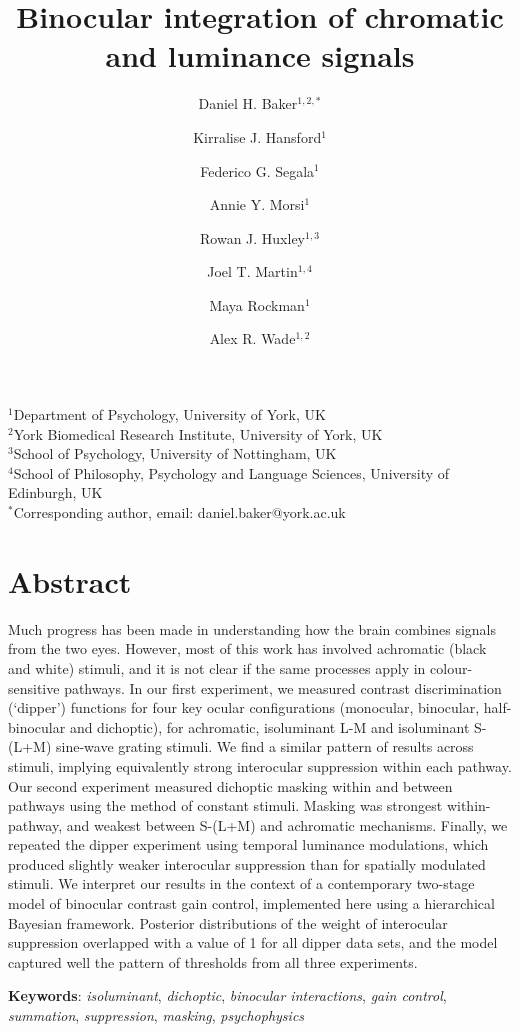 \documentclass[
  letterpaper,
  DIV=11,
  numbers=noendperiod]{scrartcl}
\title{Binocular integration of chromatic and luminance signals}
\author{Daniel H. Baker\(^{1,2,*}\) \and Kirralise J.
Hansford\(^1\) \and Federico G. Segala\(^1\) \and Annie Y.
Morsi\(^1\) \and Rowan J. Huxley\(^{1,3}\) \and Joel T.
Martin\(^{1,4}\) \and Maya Rockman\(^1\) \and Alex R. Wade\(^{1,2}\)}
\date{}
\begin{document}
\maketitle

\(^1\)Department of Psychology, University of York, UK\\
\(^2\)York Biomedical Research Institute, University of York, UK\\
\(^3\)School of Psychology, University of Nottingham, UK\\
\(^4\)School of Philosophy, Psychology and Language Sciences, University
of Edinburgh, UK\\
\(^*\)Corresponding author, email: daniel.baker@york.ac.uk

\section{Abstract}\label{abstract}

Much progress has been made in understanding how the brain combines
signals from the two eyes. However, most of this work has involved
achromatic (black and white) stimuli, and it is not clear if the same
processes apply in colour-sensitive pathways. In our first experiment,
we measured contrast discrimination (`dipper') functions for four key
ocular configurations (monocular, binocular, half-binocular and
dichoptic), for achromatic, isoluminant L-M and isoluminant S-(L+M)
sine-wave grating stimuli. We find a similar pattern of results across
stimuli, implying equivalently strong interocular suppression within
each pathway. Our second experiment measured dichoptic masking within
and between pathways using the method of constant stimuli. Masking was
strongest within-pathway, and weakest between S-(L+M) and achromatic
mechanisms. Finally, we repeated the dipper experiment using temporal
luminance modulations, which produced slightly weaker interocular
suppression than for spatially modulated stimuli. We interpret our
results in the context of a contemporary two-stage model of binocular
contrast gain control, implemented here using a hierarchical Bayesian
framework. Posterior distributions of the weight of interocular
suppression overlapped with a value of 1 for all dipper data sets, and
the model captured well the pattern of thresholds from all three
experiments.

\textbf{Keywords}: \emph{isoluminant}, \emph{dichoptic}, \emph{binocular
interactions}, \emph{gain control}, \emph{summation},
\emph{suppression}, \emph{masking}, \emph{psychophysics}
\end{document}
